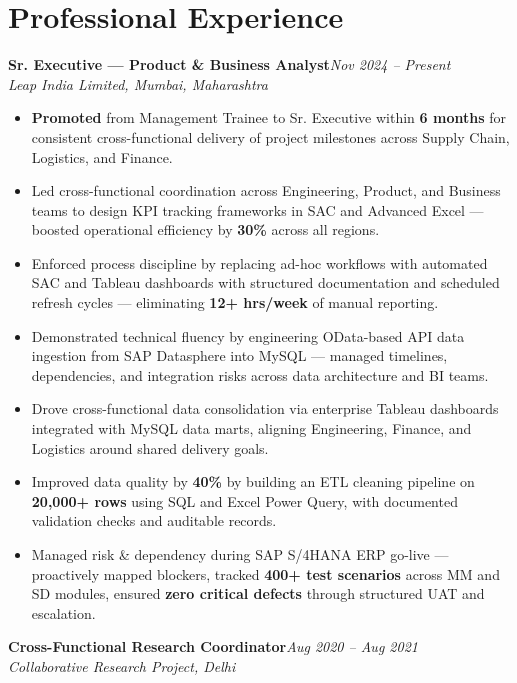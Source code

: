 \documentclass[10pt, letterpaper]{article}
\newcommand{\role}[3]{%
  \vspace{2pt}%
  {\bfseries #1}\hfill{\small\color{muted}\textit{#3}}\\[-2pt]%
  {\small\color{muted}\textit{#2}}%
}
\begin{document}
\section{Professional Experience}

\role{Sr. Executive — Product \& Business Analyst}{Leap India Limited, Mumbai, Maharashtra}{Nov 2024 – Present}

\begin{itemize}
  \item \textbf{Promoted} from Management Trainee to Sr. Executive within \textbf{6 months} for consistent cross-functional delivery of project milestones across Supply Chain, Logistics, and Finance.
  \item Led cross-functional coordination across Engineering, Product, and Business teams to design KPI tracking frameworks in SAC and Advanced Excel — boosted operational efficiency by \textbf{30\%} across all regions.
  \item Enforced process discipline by replacing ad-hoc workflows with automated SAC and Tableau dashboards with structured documentation and scheduled refresh cycles — eliminating \textbf{12+ hrs/week} of manual reporting.
  \item Demonstrated technical fluency by engineering OData-based API data ingestion from SAP Datasphere into MySQL — managed timelines, dependencies, and integration risks across data architecture and BI teams.
  \item Drove cross-functional data consolidation via enterprise Tableau dashboards integrated with MySQL data marts, aligning Engineering, Finance, and Logistics around shared delivery goals.
  \item Improved data quality by \textbf{40\%} by building an ETL cleaning pipeline on \textbf{20,000+ rows} using SQL and Excel Power Query, with documented validation checks and auditable records.
  \item Managed risk \& dependency during SAP S/4HANA ERP go-live — proactively mapped blockers, tracked \textbf{400+ test scenarios} across MM and SD modules, ensured \textbf{zero critical defects} through structured UAT and escalation.
\end{itemize}

\vspace{1pt}

\role{Cross-Functional Research Coordinator}{Collaborative Research Project, Delhi}{Aug 2020 – Aug 2021}
\end{document}
